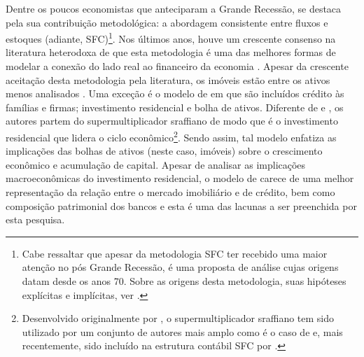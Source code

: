 Dentre os poucos economistas que anteciparam a Grande Recessão, \textcite{godley_seven_1999} se destaca pela sua contribuição metodológica: a abordagem consistente entre fluxos e estoques (adiante, SFC)\footnote{Cabe ressaltar que apesar da metodologia SFC ter recebido uma maior atenção no pós Grande Recessão, é uma proposta de análise cujas origens datam desde os anos 70. Sobre as origens desta metodologia, suas hipóteses explícitas e implícitas, ver \textcite{teixeira_crescimento_2015}.}.
Nos últimos anos, houve um crescente consenso na literatura heterodoxa de que esta metodologia é uma das melhores formas de modelar a conexão do lado real ao financeiro da economia \cite{nikiforos_stock-flow_2017}.
Apesar da crescente aceitação desta metodologia pela literatura, os imóveis estão entre os ativos menos analisados  \cite{caverzasi_stock-flow_2013}.
Uma exceção é o modelo de \textcites{petrini_demanda_2019}{petrini_long_2020} em que são incluídos crédito às famílias e firmas; investimento residencial e bolha de ativos.
Diferente de \textcite{zezza_u.s._2008} e \textcite{nikolaidi_securitisation_2015}, os autores partem do supermultiplicador sraffiano de modo que é o investimento residencial que lidera o ciclo econômico\footnote{
    Desenvolvido originalmente por \textcite{serrano_sraffian_1995}, o supermultiplicador sraffiano tem sido utilizado por um conjunto de autores mais amplo como é o caso de \textcites{allain_tackling_2015}{lavoie_convergence_2016}{serrano_sraffian_2017}{dutt_observations_2018} e, mais recentemente, sido incluído na estrutura contábil SFC por \textcites{brochier_supermultiplier_2018}{mandarino_workers_2020}.
}.
Sendo assim,  tal modelo enfatiza as implicações das bolhas de ativos (neste caso, imóveis) sobre o crescimento econômico e acumulação de capital.
Apesar de analisar as implicações macroeconômicas do investimento residencial, o modelo de \textcite{petrini_demanda_2019} carece de uma melhor representação da relação entre o mercado imobiliário e de crédito, bem como composição patrimonial dos bancos e esta é uma das lacunas a ser preenchida por esta pesquisa.


